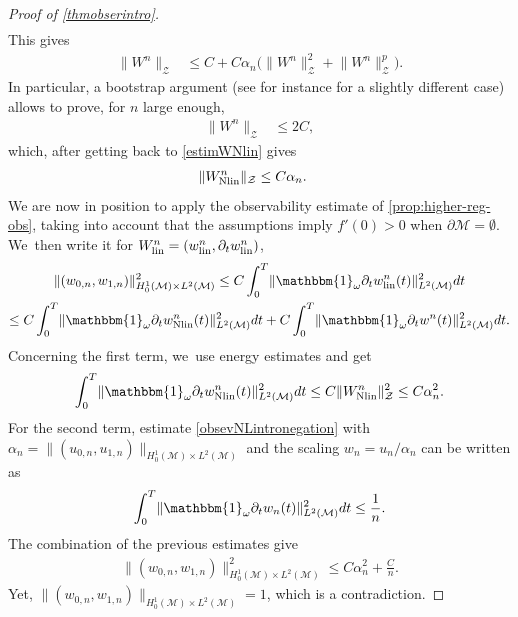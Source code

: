 \documentclass[JEP,XML,SOM,Unicode,published]{cedram}
\newcommand{\lin}{\textup{lin}}
\newcommand{\Nlin}{\textup{Nlin}}
\theoremstyle{definition}
\let\mc\mathcal
\newcommand{\M}{\mc{M}}
\providecommand{\norm}[1]{\lVert#1\rVert}
\begin{document}
\begin{proof}[Proof of \cref{thmobserintro}]
\begin{align}
\end{align}
This gives
\begin{align*}
\norm{W^n}_{\mc{Z}}&\leq C+ C\alpha_n\bigl( \norm{W^n}_{\mc{Z}}^2+ \norm{W^n}_{\mc{Z}}^p\bigr).
\end{align*}
In particular, a bootstrap argument (see for instance \cite[Lem.\,2.2.]{BG:99} for a slightly different case) allows to prove, for $n$ large enough,
\begin{align*}
\norm{W^n}_{\mc{Z}}&\leq 2C,
\end{align*}
which, after getting back to \eqref{estimWNlin} gives
\begin{align*}
\norm{W_{\Nlin}^n}_{\mc{Z}}&\leq C\alpha_n .
\end{align*}
We are now in position to apply the observability estimate of \cref{prop:higher-reg-obs}, taking into account that the assumptions imply $f'(0)>0$ when $\partial \M=\emptyset$. We~then write it for $W^n_{\lin}=(w^n_{\lin},\partial_tw_{\lin}^n)$,\vspace*{-10pt}
\begin{multline*}
\norm{(w_{0,n},w_{1,n})}_{H_0^1(\M)\times L^2(\M)}^2\leq C \int_0^T \norm{\mathbbm{1}_\omega\partial_t w^{n}_{\lin}(t)}_{L^2(\M)}^2 dt\\
\leq C \int_0^T \norm{\mathbbm{1}_\omega\partial_t w^{n}_{\Nlin}(t)}_{L^2(\M)}^2 dt+ C \int_0^T \norm{\mathbbm{1}_\omega\partial_t w^{n}(t)}_{L^2(\M)}^2 dt.
\end{multline*}
Concerning the first term, we~use energy estimates and get\vspace*{-3pt}
\begin{align*}
\int_0^T \norm{\mathbbm{1}_\omega\partial_t w^{n}_{\Nlin}(t)}_{L^2(\M)}^2 dt\leq C\norm{W_{\Nlin}^n}_{\mc{Z}}^2\leq C\alpha_n^2.
\end{align*}
For the second term, estimate \eqref{obsevNLintronegation} with $\alpha_n=\norm{(u_{0,n},u_{1,n})}_{H_0^1(\M)\times L^2(\M)}$ and the scaling $w_n=u_n/\alpha_n$ can be written as\vspace*{-3pt}
\begin{align*}
\int_0^T \norm{\mathbbm{1}_\omega\partial_t w_{n}(t)}_{L^2(\M)}^2 dt
\leq \frac{1}{n}. \end{align*}
The combination of the previous estimates give\vspace*{-3pt}
\begin{align*}
\norm{(w_{0,n},w_{1,n})}_{H_0^1(\M)\times L^2(\M)}^2\leq C\alpha_n^2+\frac{C}{n}.
\end{align*}
Yet, $\norm{(w_{0,n},w_{1,n})}_{H_0^1(\M)\times L^2(\M)}=1$, which is a contradiction.
\end{proof}
\end{document}
